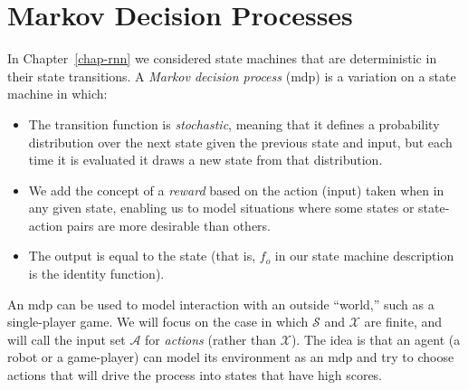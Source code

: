 \chapter{Markov Decision Processes}
\label{chap-mdps}

In Chapter~\ref{chap-rnn} we considered state machines that are deterministic
in their state transitions.
A {\em Markov decision process} ({\sc mdp}) is a variation on a state
machine in which:
\begin{itemize}
  \item The transition function is {\em stochastic},   meaning that it
        defines a probability distribution over the next state given the
        previous state and input, but each time it is evaluated it draws a
        new state from that distribution.
  \item We add the concept of a {\em reward} based on the action
        (input) taken when in any given state, enabling us to model
        situations where some states or state-action pairs are more
        desirable than others.
  \item The output is equal to the state (that is, $f_o$ in our state
        machine description is the identity function).
\end{itemize}

An {\sc mdp} can be used to model interaction with an outside
``world,'' such as a single-player  game.  We will focus on the case in which $\mathcal S$ and
$\mathcal X$ are finite, and will call the input set $\mathcal A$ for
  {\em actions} (rather than $\mathcal X$).  The idea is that an agent
(a robot or a game-player) can model its environment as an {\sc mdp}
and try to choose actions that will drive the process into states that
have high scores.



